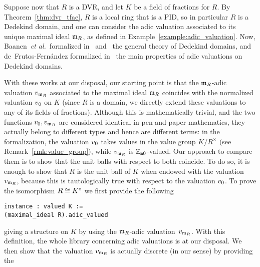 \documentclass[sigplan,screen]{acmart}
\begin{document}
Suppose now that $R$ is a DVR, and let $K$ be a field of fractions for $R$. By Theorem~\ref{thm:dvr_tfae}, $R$ is a local ring that is a PID, so in particular $R$ is a Dedekind domain, and one can consider the adic valuation associated to its unique maximal ideal $\mathfrak{m}_{R}$, as defined in Example~\ref{example:adic_valuation}. Now, Baanen~\emph{et al.}~formalized in~\cite{BaaDahNarNuc21} and~\cite{BaaDahNarNuc22} the general theory of Dedekind domains, and de~Frutos-Fernández formalized in~\cite{deF22} the main properties of adic valuations on Dedekind domains.

With these works at our disposal, our starting point is that the $\mathfrak{m}_{R}$-adic valuation $v_{\mathfrak{m}_{R}}$ associated to the maximal ideal $\mathfrak{m}_{R}$ coincides with the normalized valuation ${v}_{0}$ on $K$ (since $R$ is a domain, we directly extend these valuations to any of its fields of fractions). Although this is mathematically trivial, and the two functions ${v}_{0},v_{\mathfrak{m}_{R}}$ 
are considered identical in pen-and-paper mathematics, they actually belong to different types and hence are different terms: in the \mathlib formalization, the valuation ${v}_{0}$ takes values\href{https://leanprover-community.github.io/mathlib_docs/ring_theory/valuation/valuation_subring.html#valuation_subring.valuation}{\extlink} in the value group $K/R^\times$ (see Remark~\ref{rmk:value_group}), while $v_{\mathfrak{m}_{R}}$ is $\mathbb{Z}_{\mathtt{m}0}$-valued\href{https://leanprover-community.github.io/mathlib_docs/ring_theory/dedekind_domain/adic_valuation.html#is_dedekind_domain.height_one_spectrum.valuation}{\extlink}. Our approach to compare them is to show that the unit balls with respect to both coincide. To do so, it is enough to show that $R$ is the unit ball of $K$ when endowed with the valuation $v_{\mathfrak{m}_{R}}$, because this is tautologically true with respect to the valuation ${v}_{0}$. To prove the isomorphism $R\cong {K}^\circ$ we first provide the following\href{https://github.com/mariainesdff/local_fields_journal/blob/7ac213eb804fe7945468023527a0fe26ab23b3c8/src/discrete_valuation_ring/basic.lean#L456}{\extlink}
\begin{lstlisting}[caption={The \code{valued} instance on the field of frations of a DVR.}, label={code:valued_DVR}]
instance : valued K :=
(maximal_ideal R).adic_valued
\end{lstlisting}
giving a  structure on $K$ by using the $\mathfrak{m}_{R}$-adic valuation~$v_{\mathfrak{m}_{R}}$. With this definition, the whole library concerning adic valuations is at our disposal. We then show that the valuation $v_{\mathfrak{m}_{R}}$ is actually discrete (in our sense)  by providing the\href{https://github.com/mariainesdff/local_fields_journal/blob/7ac213eb804fe7945468023527a0fe26ab23b3c8/src/discrete_valuation_ring/basic.lean#L458}{\extlink}
\end{document}
